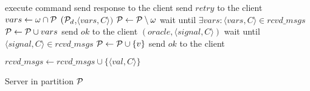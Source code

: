 \begin{algorithm}[t!]
\small

\begin{distribalgo}[1]

		\STATE execute command
		\STATE send response to the client
	\ELSE
		\STATE send $retry$ to the client
	\ENDIF
\ENDINDENT
\vspace{1.0mm}
			\STATE $vars \leftarrow \omega \cap \mathcal{P}$
			\STATE \rmcast$(\mathcal{P}_d$,$\langle vars, C \rangle)$
			\STATE $\mathcal{P} \leftarrow \mathcal{P} \setminus \omega$
%
%			
			\STATE wait until $\exists vars : \langle vars, C \rangle \in rcvd\_msgs$
				\STATE $\mathcal{P} \leftarrow \mathcal{P} \cup vars$
		\ENDIF
		\STATE send $ok$ to the client
        	\ENDINDENT
	\vspace{1.0mm}
		\STATE \rmcast$(oracle, \langle signal, C \rangle )$
		\STATE wait until $\langle signal, C \rangle \in rcvd\_msgs$
		\STATE $\mathcal{P} \leftarrow \mathcal{P} \cup \{v\}$
		\STATE send $ok$ to the client
        	\ENDINDENT

    \vspace{1.0mm}

        \STATE $rcvd\_msgs \leftarrow rcvd\_msgs \cup \{\langle val, C \rangle\}$
    \ENDINDENT


\caption{Server in partition $\mathcal{P}$}
\label{alg:server_proxy}
\end{distribalgo}
\end{algorithm}